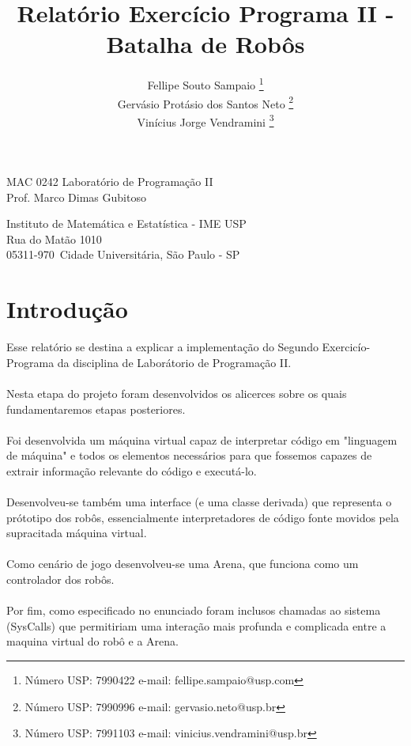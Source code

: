 \documentclass[a4paper]{article}
\title{Relatório Exercício Programa II - Batalha de Robôs}
\author{
Fellipe Souto Sampaio \footnote{Número USP: 7990422 e-mail: fellipe.sampaio@usp.com}\\
Gervásio Protásio dos Santos Neto \footnote{Número USP: 7990996 e-mail: gervasio.neto@usp.br}\\
Vinícius Jorge Vendramini \footnote{Número USP: 7991103 e-mail: vinicius.vendramini@usp.br}
}
\begin{document}
\maketitle

\begin{center}
MAC 0242 Laboratório de Programa\c{c}ão II \\
Prof. Marco Dimas Gubitoso \\
             
\end{center}

\begin{center}
Instituto de Matemática e Estatística - IME USP \\
 Rua do Matão 1010 \\
 05311-970\, Cidade Universitária, São Paulo - SP \\
\end{center}

\newpage

\section{Introdução}

Esse relatório se destina a explicar a implementação do Segundo Exercicío-Programa da disciplina de Laborátorio de Programação II.\\\\
Nesta etapa do projeto foram desenvolvidos os alicerces sobre os quais fundamentaremos etapas posteriores.\\\\
Foi desenvolvida um máquina virtual capaz de interpretar código em "linguagem de máquina" e todos os elementos necessários para que fossemos capazes de extrair informação relevante do código e executá-lo.\\\\
Desenvolveu-se também uma interface (e uma classe derivada) que representa o prótotipo dos robôs, essencialmente interpretadores de código fonte movidos pela supracitada máquina virtual.\\\\
Como cenário de jogo desenvolveu-se uma Arena, que funciona como um controlador dos robôs.\\\\
Por fim, como especificado no enunciado foram inclusos chamadas ao sistema (SysCalls) que permitiriam uma interação mais profunda e complicada entre a maquina virtual do robô e a Arena.
\end{document}
